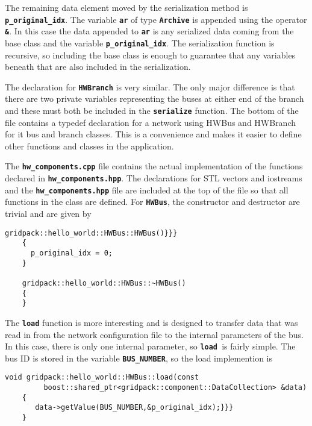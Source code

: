 The remaining data element moved by the serialization method is \texttt{\textbf{p\_original\_idx}}. The variable \texttt{\textbf{ar}} of type \texttt{\textbf{Archive}} is appended using the operator \texttt{\textbf{\&}}. In this case the data appended to \texttt{\textbf{ar}} is any serialized data coming from the base class and the variable \texttt{\textbf{p\_original\_idx}}. The serialization function is recursive, so including the base class is enough to guarantee that any variables beneath that are also included in the serialization.

The declaration for \texttt{\textbf{HWBranch}} is very similar. The only major difference is that there are two private variables representing the buses at either end of the branch and these must both be included in the \texttt{\textbf{serialize}} function.
The bottom of the file contains a typedef declaration for a network using HWBus and HWBranch for it bus and branch classes. This is a convenience and makes it easier to define other functions and classes in the application.

The \texttt{\textbf{hw\_components.cpp}} file contains the actual implementation of the functions declared in \texttt{\textbf{hw\_components.hpp}}. The declarations for STL vectors and iostreams and the \texttt{\textbf{hw\_components.hpp}} file are included at the top of the file so that all functions in the class are defined. For \texttt{\textbf{HWBus}}, the constructor and destructor are trivial and are given by

{
\color{red}
\begin{Verbatim}[fontseries=b]
    gridpack::hello_world::HWBus::HWBus()}}}
    {
      p_original_idx = 0;
    }

    gridpack::hello_world::HWBus::~HWBus()
    {
    }
\end{Verbatim}
}

The \texttt{\textbf{load}} function is more interesting and is designed to transfer data that was read in from the network configuration file to the internal parameters of the bus. In this case, there is only one internal parameter, so \texttt{\textbf{load }}is fairly simple. The bus ID is stored in the variable \texttt{\textbf{BUS\_NUMBER}}, so the load implemention is

{
\color{red}
\begin{Verbatim}[fontseries=b]
    void gridpack::hello_world::HWBus::load(const
         boost::shared_ptr<gridpack::component::DataCollection> &data)
    {
       data->getValue(BUS_NUMBER,&p_original_idx);}}}
    }
\end{Verbatim}
}


